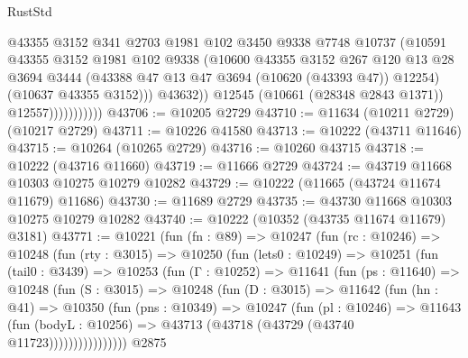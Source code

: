 \begin{lexlean}{RustStd}
\begin{coremodule}
                              @43355
                              @3152
                              @341
                              @2703
                              @1981
                              @102
                              @3450
                              @9338
                              @7748
                              @10737
                              (@10591
                                @43355
                                @3152
                                @1981
                                @102
                                @9338
                                (@10600
                                  @43355
                                  @3152
                                  @267
                                  @120
                                  @13
                                  @28
                                  @3694
                                  @3444
                                  (@43388 @47 @13 @47 @3694 (@10620 (@43393 @47)) @12254)
                                  (@10637 @43355 @3152)))
                              @43632))
                          @12545
                          (@10661 (@28348 @2843 @1371))
                          @12557)))))))))))
@43706 := @10205 @2729
@43710 := @11634 (@10211 @2729) (@10217 @2729)
@43711 := @10226 @41580
@43713 := @10222 (@43711 @11646)
@43715 := @10264 (@10265 @2729)
@43716 := @10260 @43715
@43718 := @10222 (@43716 @11660)
@43719 := @11666 @2729
@43724 := @43719 @11668 @10303 @10275 @10279 @10282
@43729 := @10222 (@11665 (@43724 @11674 @11679) @11686)
@43730 := @11689 @2729
@43735 := @43730 @11668 @10303 @10275 @10279 @10282
@43740 := @10222 (@10352 (@43735 @11674 @11679) @3181)
@43771 := @10221
    (fun (fn : @89) =>
    @10247
      (fun (rc : @10246) =>
      @10248
        (fun (rty : @3015) =>
        @10250
          (fun (lets0 : @10249) =>
          @10251
            (fun (tail0 : @3439) =>
            @10253
              (fun (Γ : @10252) =>
              @11641
                (fun (ps : @11640) =>
                @10248
                  (fun (S : @3015) =>
                  @10248
                    (fun (D : @3015) =>
                    @11642
                      (fun (hn : @41) =>
                      @10350
                        (fun (pns : @10349) =>
                        @10247
                          (fun (pl : @10246) =>
                          @11643
                            (fun (bodyL : @10256) =>
                            @43713 (@43718 (@43729 (@43740 @11723))))))))))))))))
    @2875

\end{coremodule}
\end{lexlean}
